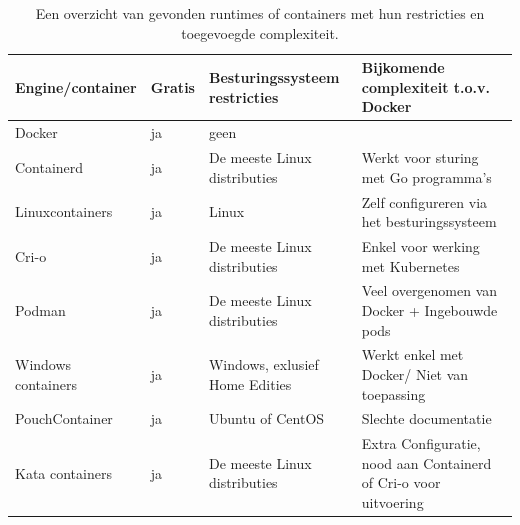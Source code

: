 \begin{center}
    \begin{table}
    \begin{tabular}{ m{3.5cm} || m{1cm} | m{3.3cm} | m{4.5cm} }
        Engine/container & Gratis & Besturingssysteem restricties & Bijkomende complexiteit t.o.v. Docker \\ 
        \hline
        Docker & ja & geen &  \\  
        \hline
        Containerd & ja & De meeste Linux distributies & Werkt voor sturing met Go programma’s \\
        \hline 
        Linuxcontainers & ja & Linux & Zelf configureren via het besturingssysteem \\
        \hline
        Cri-o & ja & De meeste Linux distributies & Enkel voor werking met Kubernetes \\
        \hline
        Podman & ja & De meeste Linux distributies & Veel overgenomen van Docker + Ingebouwde pods \\
        \hline
        Windows containers & ja & Windows, exlusief Home Edities & Werkt enkel met Docker/ Niet van toepassing \\
        \hline
        PouchContainer & ja & Ubuntu of CentOS & Slechte documentatie \\
        \hline
        Kata containers & ja & De meeste Linux distributies & Extra Configuratie, nood aan Containerd of Cri-o voor uitvoering \\
    \end{tabular}
    \label{tab:Engines}
    \caption[Overzicht Runtimes en containers]{Een overzicht van gevonden runtimes of containers met hun restricties en toegevoegde complexiteit.}
    \end{table}
\end{center}

